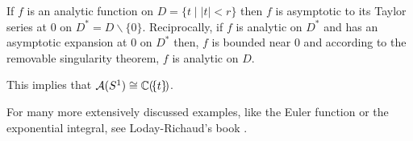 \begin{exmp}
  If $f$ is an analytic function on $D=\{t\mid |t|<r\}$ then $f$ is asymptotic
  to its Taylor series at $0$ on $D^*=D\backslash\{0\}$.
  Reciprocally, if $f$ is analytic on $D^*$ and has an asymptotic expansion at
  $0$ on $D^*$ then, $f$ is bounded near $0$ and according to the removable
  singularity theorem, $f$ is analytic on $D$.
  \begin{s-rem}
    This implies that $\mathcal{A}(S^1)\cong\mathbb{C}(\!\{t\}\!)$.
  \end{s-rem}
\end{exmp}
For many more extensively discussed examples, like the Euler function or the
exponential integral, see Loday-Richaud's book \cite[Sec.2.2]{Loday2014}.
\begin{comment}
  \begin{exmp}[Fundamental example: the Euler function]
    \marginnote{\cite[Exmp.2.2.4]{Loday2014}}
    Consider the Euler equation
    \begin{equation}
      x^2\frac{dy}{dx}+y=x \,.
    \end{equation}
    \TODO[]
  \end{exmp}
  \begin{exmp}[Classical example: the exponential integral]
    \marginnote{\cite[Exmp.2.2.5]{Loday2014}}
    Consider the exponential integral
    \begin{equation}
      Ei(x)=\int_x^{+\infty}e^{-t}\frac{dt}{t} \,.
    \end{equation}
    \TODO[]
  \end{exmp}
  \begin{exmp}[A generalized hypergeometric series ${}_3F_0$]
    \marginnote{\cite[Exmp.2.2.6]{Loday2014}}
    \TODO[]
  \end{exmp}
  \begin{exmp}[A series of a mild difference equation]
    \marginnote{\cite[Exmp.2.2.7]{Loday2014}}
    \TODO[]
  \end{exmp}
  \begin{exmp}[A series of a wild difference equation]
    \marginnote{\cite[Exmp.2.2.8]{Loday2014}}
    \TODO[]
  \end{exmp}
\end{comment}

